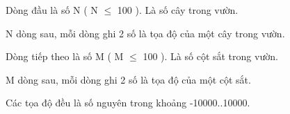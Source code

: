 Dòng đầu là số N ( N  $\le$  100 ). Là số cây trong vườn.   


   N dòng sau, mỗi dòng ghi 2 số là tọa độ của một cây trong vườn.   


   Dòng tiếp theo là số M ( M  $\le$  100 ). Là số cột sắt trong vườn.   


   M dòng sau, mỗi dòng ghi 2 số là tọa độ của một cột sắt.   


   Các tọa độ đều là số nguyên trong khoảng -10000..10000.